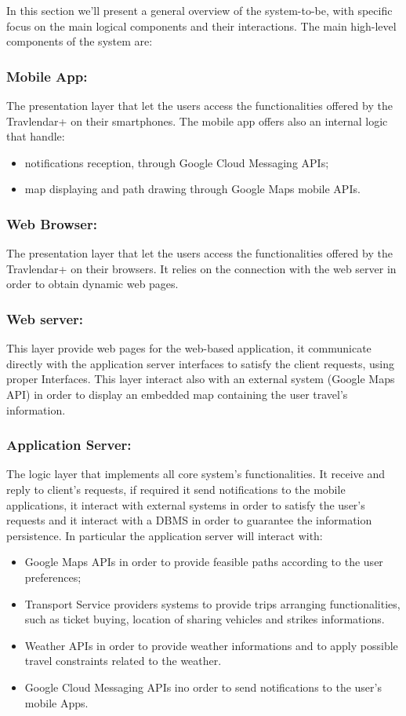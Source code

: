 In this section we'll present a general overview of the system-to-be, with specific focus on the main logical components and their interactions.
The main high-level components of the system are:
\subsubsection{Mobile App:}
\label{subsubsect:Mobile App}
The presentation layer that let the users access the functionalities offered by the Travlendar+ on their smartphones. The mobile app offers also an internal logic that handle:
\begin{itemize}
\item notifications reception, through Google Cloud Messaging APIs;
\item map displaying and path drawing through Google Maps mobile APIs.
\end{itemize}  

\subsubsection{Web Browser:}
\label{subsubsect:Web Browser}
The presentation layer that let the users access the functionalities offered by the Travlendar+ on their browsers.
It relies on the connection with the web server in order to obtain dynamic web pages.
\subsubsection{Web server:}
\label{subsubsect:Web server}
This layer provide web pages for the web-based application, it communicate directly with the application server interfaces to satisfy the client requests, using proper Interfaces. This layer interact also with an external system (Google Maps API) in order to display an embedded map containing the user travel's information.

\subsubsection{Application Server:}
\label{subsubsect:Application Server}
The logic layer that implements all core system's functionalities. It receive and reply to client's requests, if required it send notifications to the mobile applications, it interact with external systems in order to satisfy the user's requests and it interact with a DBMS in order to guarantee the information persistence.
In particular the application server will interact with:
\begin{itemize}
\item Google Maps APIs in order to provide feasible paths according to the user preferences;
\item Transport Service providers systems to provide trips arranging functionalities, such as ticket buying, location of sharing vehicles and strikes informations.
\item Weather APIs in order to provide weather informations and to apply possible travel constraints related to the weather.
\item Google Cloud Messaging APIs ino order to send notifications to the user's mobile Apps.
\end{itemize} 
